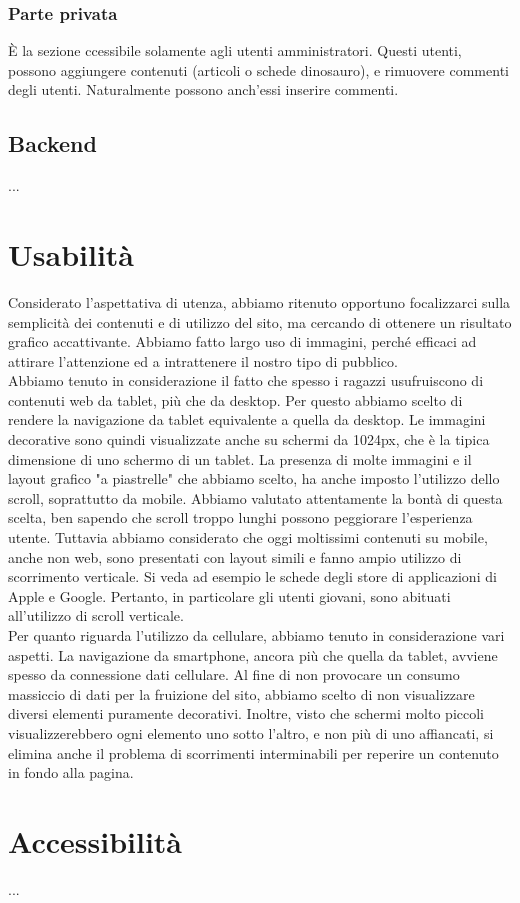 \documentclass[12pt]{article}
\begin{document}
	\subsubsection{Parte privata}
	È la sezione ccessibile solamente agli utenti amministratori. Questi utenti, possono aggiungere contenuti (articoli o schede dinosauro), e rimuovere commenti degli utenti. Naturalmente possono anch'essi inserire commenti.
	
	\subsection{Backend}
	...
	
	
	
	\section{Usabilità}
	Considerato l'aspettativa di utenza, abbiamo ritenuto opportuno focalizzarci sulla semplicità dei contenuti e di utilizzo del sito, ma cercando di ottenere un risultato grafico accattivante. Abbiamo fatto largo uso di immagini, perché efficaci ad attirare l'attenzione ed a intrattenere il nostro tipo di pubblico.\\
	Abbiamo tenuto in considerazione il fatto che spesso i ragazzi usufruiscono di contenuti web da tablet, più che da desktop. Per questo abbiamo scelto di rendere la navigazione da tablet equivalente a quella da desktop. Le immagini decorative sono quindi visualizzate anche su schermi da 1024px, che è la tipica dimensione di uno schermo di un tablet.
	La presenza di molte immagini e il layout grafico "a piastrelle" che abbiamo scelto, ha anche imposto l'utilizzo dello scroll, soprattutto da mobile. Abbiamo valutato attentamente la bontà di questa scelta, ben sapendo che scroll troppo lunghi possono peggiorare l'esperienza utente. Tuttavia abbiamo considerato che oggi moltissimi contenuti su mobile, anche non web, sono presentati con layout simili e fanno ampio utilizzo di scorrimento verticale. Si veda ad esempio le schede degli store di applicazioni di Apple e Google. Pertanto, in particolare gli utenti giovani, sono abituati all'utilizzo di scroll verticale. \\
	Per quanto riguarda l'utilizzo da cellulare, abbiamo tenuto in considerazione vari aspetti. La navigazione da smartphone, ancora più che quella da tablet, avviene spesso da connessione dati cellulare. Al fine di non provocare un consumo massiccio di dati per la fruizione del sito, abbiamo scelto di non visualizzare diversi elementi puramente decorativi. Inoltre, visto che schermi molto piccoli visualizzerebbero ogni elemento uno sotto l'altro, e non più di uno affiancati, si elimina anche il problema di scorrimenti interminabili per reperire un contenuto in fondo alla pagina.
	
	\section{Accessibilità}
	...	
	
\end{document}
